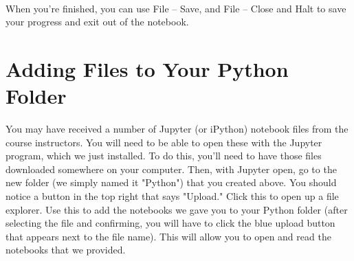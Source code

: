 \documentclass[]{article}
\begin{document}
\paragraph{}
When you're finished, you can use File -- Save, and File -- Close and Halt to save your progress and exit out of the notebook.

\section*{Adding Files to Your Python Folder}
You may have received a number of Jupyter (or iPython) notebook files from the course instructors. You will need to be able to open these with the Jupyter program, which we just installed. To do this, you'll need to have those files downloaded somewhere on your computer. Then, with Jupyter open, go to the new folder (we simply named it "Python") that you created above. You should notice a button in the top right that says "Upload." Click this to open up a file explorer. Use this to add the notebooks we gave you to your Python folder (after selecting the file and confirming, you will have to click the blue upload button that appears next to the file name). This will allow you to open and read the notebooks that we provided.
\end{document}
